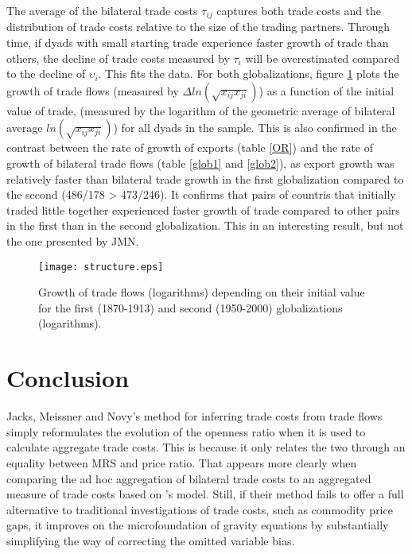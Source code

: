 \documentclass{article}
\begin{document}
The average of the bilateral trade costs $\tau_{ij}$ captures both trade
costs and the distribution of trade costs relative to the size
of the trading partners. Through time, if dyads with small starting trade experience  faster growth of trade than others, the decline of trade costs measured by $\tau_i$ will be overestimated compared to the decline of $\upsilon_i$.
This fits the data. For both globalizations, figure
\ref{structure} plots the growth of trade flows (measured by
$\Delta ln (\sqrt{x_{ij} x_{ji}})$) as a function of the
initial value of trade, (measured by the logarithm of the
geometric average of bilateral average $ln(\sqrt{x_{ij}
x_{ji}})$) for all dyads in the sample. This is also confirmed in the contrast between the rate of growth of exports
(table \ref{OR}) and the rate of growth of bilateral trade flows (table \ref{glob1} and \ref{glob2}), as export growth was relatively faster than bilateral trade growth in the first globalization compared to the second (486/178 > 473/246). It confirms that pairs of countris that initially traded little together experienced faster growth of trade compared to other pairs in the first than in the second globalization.  This in an interesting result, but not the one presented by JMN.

\begin{figure}
\centering
\texttt{[image: structure.eps]}
\caption{Growth of trade flows (logarithms) depending on their initial value for the first (1870-1913) and second (1950-2000) globalizations (logarithms).}\label{structure}
\end{figure}

\section{\label{5} Conclusion}

Jacks, Meissner and Novy's method for inferring trade costs
from trade flows simply reformulates the evolution of the
openness ratio when it is used to calculate aggregate trade
costs. This is because it only relates the two through an
equality between MRS and price ratio. That appears more clearly
when comparing the ad hoc aggregation of bilateral trade costs
to an aggregated measure of trade costs based on
\cite{AW2003}'s model. Still, if their method fails to offer a
full alternative to traditional investigations of trade costs,
such as commodity price gaps, it improves on the
microfoundation of gravity equations by substantially
simplifying the way of correcting the omitted variable bias.
\end{document}

